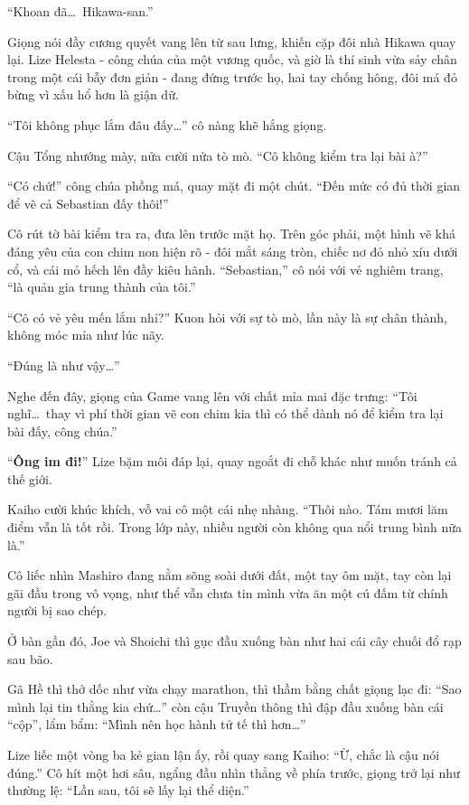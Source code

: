 \documentclass[../main.tex]{subfiles}
\begin{document}
``Khoan đã\dots\ Hikawa-san.''

Giọng nói đầy cương quyết vang lên từ sau lưng, khiến cặp đôi nhà Hikawa quay lại. Lize Helesta - công chúa của một vương quốc, và giờ là thí sinh vừa sảy chân trong một cái bẫy đơn giản - đang đứng trước họ, hai tay chống hông, đôi má đỏ bừng vì xấu hổ hơn là giận dữ.

``Tôi không phục lắm đâu đấy\dots'' cô nàng khẽ hắng giọng.

Cậu Tổng nhướng mày, nửa cười nửa tò mò. ``Cô không kiểm tra lại bài à?''

``Có chứ!'' công chúa phồng má, quay mặt đi một chút. ``Đến mức có đủ thời gian để vẽ cả Sebastian đấy thôi!''

Cô rút tờ bài kiểm tra ra, đưa lên trước mặt họ. Trên góc phải, một hình vẽ khá đáng yêu của con chim non hiện rõ - đôi mắt sáng tròn, chiếc nơ đỏ nhỏ xíu dưới cổ, và cái mỏ hếch lên đầy kiêu hãnh. ``Sebastian,'' cô nói với vẻ nghiêm trang, ``là quản gia trung thành của tôi.''

``Cô có vẻ yêu mến lắm nhỉ?'' Kuon hỏi với sự tò mò, lần này là sự chân thành, không móc mỉa như lúc nãy.

``Đúng là như vậy\dots''

Nghe đến đây, giọng của Game vang lên với chất mỉa mai đặc trưng: ``Tôi nghĩ\dots\ thay vì phí thời gian vẽ con chim kia thì có thể dành nó để kiểm tra lại bài đấy, công chúa.''

``\textbf{Ông im đi!}'' Lize bặm môi đáp lại, quay ngoắt đi chỗ khác như muốn tránh cả thế giới.

Kaiho cười khúc khích, vỗ vai cô một cái nhẹ nhàng. ``Thôi nào. Tám mươi lăm điểm vẫn là tốt rồi. Trong lớp này, nhiều người còn không qua nổi trung bình nữa là.''

Cô liếc nhìn Mashiro đang nằm sõng soài dưới đất, một tay ôm mặt, tay còn lại gãi đầu trong vô vọng, như thể vẫn chưa tin mình vừa ăn một cú đấm từ chính người bị sao chép.

Ở bàn gần đó, Joe và Shoichi thì gục đầu xuống bàn như hai cái cây chuối đổ rạp sau bão.

Gã Hề thì thở dốc như vừa chạy marathon, thì thầm bằng chất giọng lạc đi: ``Sao mình lại tin thằng kia chứ\dots'' còn cậu Truyền thông thì đập đầu xuống bàn cái ``cộp'', lẩm bẩm: ``Mình nên học hành tử tế thì hơn\dots''

Lize liếc một vòng ba kẻ gian lận ấy, rồi quay sang Kaiho: ``Ừ, chắc là cậu nói đúng.'' Cô hít một hơi sâu, ngẩng đầu nhìn thẳng về phía trước, giọng trở lại như thường lệ: ``Lần sau, tôi sẽ lấy lại thể diện.''
\end{document}
